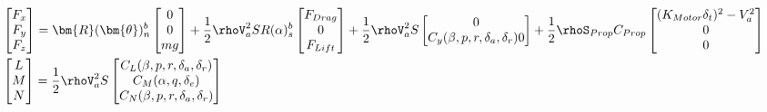 \begin{subequations}
\begin{align}
& \begin{bmatrix}
F_x \\
F_y \\
F_z
\end{bmatrix}
 = 
 \bm{R}(\bm{\theta})^b_n\begin{bmatrix}
 0 \\
 0 \\
 mg
 \end{bmatrix}
 + \frac{1}{2}\rhoV_a^2SR(\alpha)_s^b\begin{bmatrix}
 F_{Drag} \\
 0 \\
 F_{Lift}
 \end{bmatrix}
 + \frac{1}{2}\rhoV_a^2S\begin{bmatrix}
 0 \\
 C_y(\beta,p,r,\delta_a,\delta_r)
 0
 \end{bmatrix}
 + \frac{1}{2}\rhoS_{Prop}C_{Prop}\begin{bmatrix}
 (K_{Motor}\delta_t)^2-V_a^2 \\
 0 \\
 0
 \end{bmatrix} \\
 & \begin{bmatrix}
 L \\
 M \\
 N 
 \end{bmatrix}
 =
 \frac{1}{2}\rhoV_a^2S\begin{bmatrix}
 C_L(\beta,p,r,\delta_a,\delta_r) \\
 C_M(\alpha,q,\delta_e) \\
 C_N(\beta,p,r,\delta_a,\delta_r)
 \end{bmatrix}
\end{align}
\end{subequations}